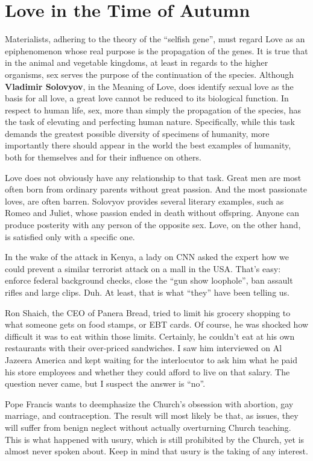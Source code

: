 \section{Love in the Time of Autumn}

Materialists, adhering to the theory of the ``selfish gene'', must regard Love as an epiphenomenon whose real purpose is the propagation of the genes. It is true that in the animal and vegetable kingdoms, at least in regards to the higher organisms, sex serves the purpose of the continuation of the species. Although \textbf{Vladimir Solovyov}, in the Meaning of Love, does identify sexual love as the basis for all love, a great love cannot be reduced to its biological function. In respect to human life, sex, more than simply the propagation of the species, has the task of elevating and perfecting human nature. Specifically, while this task demands the greatest possible diversity of specimens of humanity, more importantly there should appear in the world the best examples of humanity, both for themselves and for their influence on others.

Love does not obviously have any relationship to that task. Great men are most often born from ordinary parents without great passion. And the most passionate loves, are often barren. Solovyov provides several literary examples, such as Romeo and Juliet, whose passion ended in death without offspring. Anyone can produce posterity with any person of the opposite sex. Love, on the other hand, is satisfied only with a specific one.

In the wake of the attack in Kenya, a lady on CNN asked the expert how we could prevent a similar terrorist attack on a mall in the USA. That's easy: enforce federal background checks, close the ``gun show loophole'', ban assault rifles and large clips. Duh. At least, that is what ``they'' have been telling us.

Ron Shaich, the CEO of Panera Bread, tried to limit his grocery shopping to what someone gets on food stamps, or EBT cards. Of course, he was shocked how difficult it was to eat within those limits. Certainly, he couldn't eat at his own restaurants with their over-priced sandwiches. I saw him interviewed on Al Jazeera America and kept waiting for the interlocutor to ask him what he paid his store employees and whether they could afford to live on that salary. The question never came, but I suspect the answer is ``no''.

Pope Francis wants to deemphasize the Church's obsession with abortion, gay marriage, and contraception. The result will most likely be that, as issues, they will suffer from benign neglect without actually overturning Church teaching. This is what happened with usury, which is still prohibited by the Church, yet is almost never spoken about. Keep in mind that usury is the taking of any interest.

